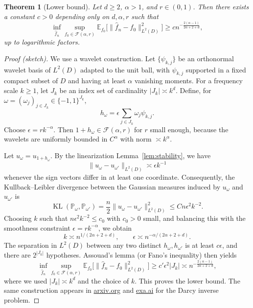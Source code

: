 \documentclass[11pt]{article}
\newtheorem{theorem}{Theorem}[section]
\theoremstyle{definition}
\theoremstyle{remark}
\newcommand{\E}{\mathbb{E}}
\newcommand{\Prob}{\mathbb{P}}
\newcommand{\F}{\mathcal{F}}
\begin{document}
\begin{theorem}[Lower bound]\label{thm:lower}
Let \(d\ge 2\), \(\alpha>1\), and \(r\in(0,1)\). Then there exists a constant \(c>0\) depending only on \(d,\alpha,r\) such that
\begin{equation}\label{eq:lower}
\inf_{\hat f_n}\sup_{f_0\in \F(\alpha,r)}
\E_{f_0}\bigl[\|\hat f_n-f_0\|_{L^2(D)}^2\bigr]
\ge c n^{-\frac{2(\alpha-1)}{2\alpha+2+d}},
\end{equation}
up to logarithmic factors.
\end{theorem}

\begin{proof}[Proof (sketch)]
We use a wavelet construction. Let \(\{\psi_{k,j}\}\) be an orthonormal wavelet basis of \(L^2(D)\) adapted to the unit ball, with \(\psi_{k,j}\) supported in a fixed compact subset of \(D\) and having at least \(\alpha\) vanishing moments. For a frequency scale \(k\ge 1\), let \(J_k\) be an index set of cardinality \(|J_k|\asymp k^d\). Define, for \(\omega=(\omega_j)_{j\in J_k}\in\{-1,1\}^{J_k}\),
\[
h_\omega=\epsilon\sum_{j\in J_k}\omega_j\psi_{k,j}.
\]
Choose \(\epsilon=r k^{-\alpha}\). Then \(1+h_\omega\in \F(\alpha,r)\) for \(r\) small enough, because the wavelets are uniformly bounded in \(C^\alpha\) with norm \(\asymp k^\alpha\).

Let \(u_\omega=u_{1+h_\omega}\). By the linearization Lemma~\ref{lem:stability}, we have
\[
\|u_\omega-u_{\omega'}\|_{L^2(D)}\asymp \epsilon k^{-1}
\]
whenever the sign vectors differ in at least one coordinate. Consequently, the Kullback--Leibler divergence between the Gaussian measures induced by \(u_\omega\) and \(u_{\omega'}\) is
\[
\operatorname{KL}(\Prob_\omega,\Prob_{\omega'})
=\frac{n}{2}\|u_\omega-u_{\omega'}\|_{L^2(D)}^2
\le C n \epsilon^2 k^{-2}.
\]
Choosing \(k\) such that \(n\epsilon^2 k^{-2}\le c_0\) with \(c_0>0\) small, and balancing this with the smoothness constraint \(\epsilon=r k^{-\alpha}\), we obtain
\[
k\asymp n^{1/(2\alpha+2+d)},\qquad \epsilon\asymp n^{-\alpha/(2\alpha+2+d)}.
\]
The separation in \(L^2(D)\) between any two distinct \(h_\omega,h_{\omega'}\) is at least \(c\epsilon\), and there are \(2^{|J_k|}\) hypotheses. Assouad's lemma (or Fano's inequality) then yields
\[
\inf_{\hat f_n}\sup_{f_0\in \F(\alpha,r)}
\E_{f_0}\bigl[\|\hat f_n-f_0\|_{L^2(D)}^2\bigr]
\ge c' \epsilon^2 |J_k|
\asymp n^{-\frac{2(\alpha-1)}{2\alpha+2+d}},
\]
where we used \(|J_k|\asymp k^d\) and the choice of \(k\). This proves the lower bound. The same construction appears in \href{https://arxiv.org/html/2601.09007}{arxiv.org} and \href{https://exa.ai/library/publication/rj7jk1yjt53}{exa.ai} for the Darcy inverse problem. 
\end{proof}
\end{document}
